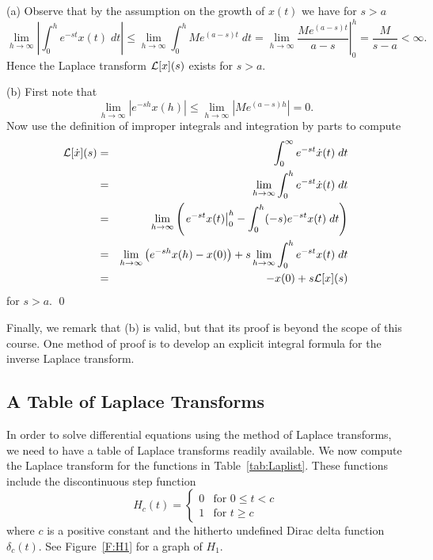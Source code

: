 \proof 
\noindent (a) Observe that by the assumption on the growth of 
$x(t)$ we have for $s>a$
\[
\lim\limits_{h\to \infty}\left|\int_0^h e^{-st} x(t)\; dt\right|
\le \lim\limits_{h\to \infty}\int_0^h Me^{(a-s)t}\; dt
=\lim\limits_{h\to \infty}\left.\frac{Me^{(a-s)t}}{a-s}\right|_0^h
=\frac{M}{s-a}<\infty.
\]
Hence the Laplace transform ${\cal L}[x](s)$ exists for $s>a$.

\noindent(b) First note that
\[
\lim\limits_{h\to \infty} |e^{-sh} x(h)|\le
\lim\limits_{h\to \infty} |Me^{(a-s)h}| = 0.
\]
Now use the definition of improper integrals and integration by parts to 
compute 
\begin{eqnarray*}
{\cal L}[\dot x](s) &=& \int_0^{\infty} e^{-st} \dot x(t)\; dt\\
& = & \lim\limits_{h\to \infty}\int_0^h e^{-st} \dot x(t)\; dt\\
& = & \lim\limits_{h\to \infty}\left(\left.e^{-st}x(t)\right|_0^h -
\int_0^h (-s)e^{-st} x(t)\; dt\right)\\
&=& \lim\limits_{h\to \infty} \left( e^{-sh} x(h) - x(0)\right) +
s\lim\limits_{h\to \infty} \int_0^h e^{-st} x(t)\; dt\\
&=& -x(0) + s{\cal L}[x](s)
\end{eqnarray*}
for $s>a$.  \qed

Finally, we remark that (b) is valid, but that its proof is 
beyond the scope of this course.  One method of proof is to develop an 
explicit integral formula for the inverse Laplace transform. 


\subsection*{A Table of Laplace Transforms}

In order to solve differential equations using the method of Laplace 
transforms, we need to have a table of Laplace transforms readily available.  
We now compute the Laplace transform for the functions in 
Table~\ref{tab:Laplist}.   These functions include the discontinuous step 
function 
\[
H_c(t) = \left\{\begin{array}{ll}
0 & \mbox{for $0\le t < c$}\\
1 & \mbox{for $t\ge c$}
\end{array}\right. 
\]
where $c$ is a positive constant and the hitherto undefined Dirac delta 
function $\delta_c(t)$.  See Figure~\ref{F:H1} for a graph of $H_1$.

